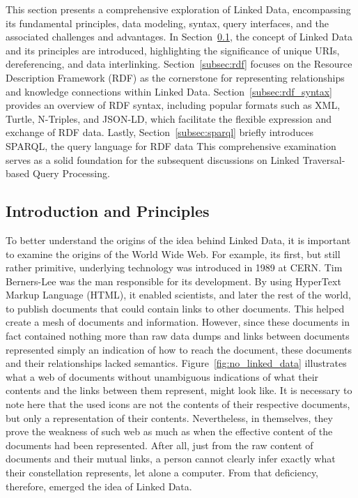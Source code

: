 This section presents a comprehensive exploration of Linked Data, encompassing its fundamental principles, data modeling, syntax, query interfaces, and the associated challenges and advantages. In Section~\ref{subsec:introduction_principles}, the concept of Linked Data and its principles are introduced, highlighting the significance of unique URIs, dereferencing, and data interlinking. Section~\ref{subsec:rdf} focuses on the Resource Description Framework (RDF) as the cornerstone for representing relationships and knowledge connections within Linked Data. Section~\ref{subsec:rdf_syntax} provides an overview of RDF syntax, including popular formats such as XML, Turtle, N-Triples, and JSON-LD, which facilitate the flexible expression and exchange of RDF data. Lastly, Section~\ref{subsec:sparql} briefly introduces SPARQL, the query language for RDF data This comprehensive examination serves as a solid foundation for the subsequent discussions on Linked Traversal-based Query Processing.

\subsection{Introduction and Principles}
\label{subsec:introduction_principles}

To better understand the origins of the idea behind Linked Data, it is important to examine the origins of the World Wide Web. For example, its first, but still rather primitive, underlying technology was introduced in 1989 at CERN. Tim Berners-Lee was the man responsible for its development. By using HyperText Markup Language (HTML), it enabled scientists, and later the rest of the world, to publish documents that could contain links to other documents. This helped create a mesh of documents and information. However, since these documents in fact contained nothing more than raw data dumps and links between documents represented simply an indication of how to reach the document, these documents and their relationships lacked semantics. Figure~\ref{fig:no_linked_data} illustrates what a web of documents without unambiguous indications of what their contents and the links between them represent, might look like. It is necessary to note here that the used icons are not the contents of their respective documents, but only a representation of their contents. Nevertheless, in themselves, they prove the weakness of such web as much as when the effective content of the documents had been represented. After all, just from the raw content of documents and their mutual links, a person cannot clearly infer exactly what their constellation represents, let alone a computer. From that deficiency, therefore, emerged the idea of Linked Data. \citep{jacksi2019development} \citep{bizer2011linked}

